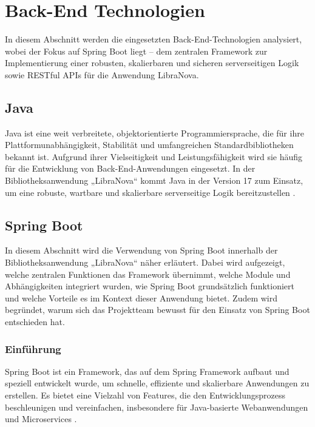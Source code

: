\section{Back-End Technologien}

In diesem Abschnitt werden die eingesetzten Back-End-Technologien analysiert, wobei der Fokus auf Spring Boot liegt – dem zentralen Framework zur Implementierung einer robusten, skalierbaren und sicheren serverseitigen Logik sowie RESTful APIs für die Anwendung LibraNova.
\subsection{Java}

Java ist eine weit verbreitete, objektorientierte Programmiersprache, die für ihre Plattformunabhängigkeit, Stabilität und umfangreichen Standardbibliotheken bekannt ist. Aufgrund ihrer Vielseitigkeit und Leistungsfähigkeit wird sie häufig für die Entwicklung von Back-End-Anwendungen eingesetzt. In der Bibliotheksanwendung „LibraNova“ kommt Java in der Version 17 zum Einsatz, um eine robuste, wartbare und skalierbare serverseitige Logik bereitzustellen \cite{Java:2024}.

\subsection{Spring Boot}

In diesem Abschnitt wird die Verwendung von Spring Boot innerhalb der Bibliotheksanwendung „LibraNova“ näher erläutert. Dabei wird aufgezeigt, welche zentralen Funktionen das Framework übernimmt, welche Module und Abhängigkeiten integriert wurden, wie Spring Boot grundsätzlich funktioniert und welche Vorteile es im Kontext dieser Anwendung bietet. Zudem wird begründet, warum sich das Projektteam bewusst für den Einsatz von Spring Boot entschieden hat.

\subsubsection{Einführung}

Spring Boot ist ein Framework, das auf dem Spring Framework aufbaut und speziell entwickelt wurde, um schnelle, effiziente und skalierbare Anwendungen zu erstellen. Es bietet eine Vielzahl von Features, die den Entwicklungsprozess beschleunigen und vereinfachen, insbesondere für Java-basierte Webanwendungen und Microservices \cite{Spring-Framework:o.J}.

